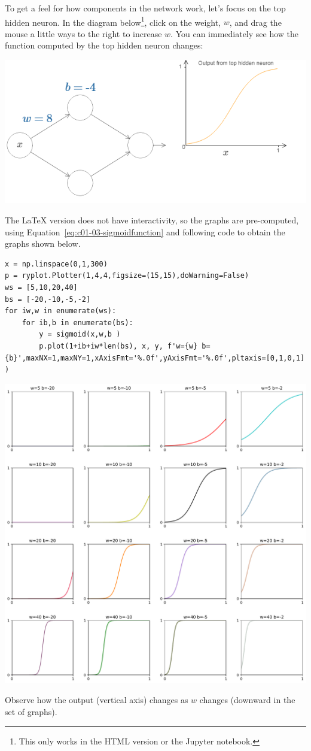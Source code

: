 To get a feel for how components in the network work, let's focus on the top hidden neuron. In the diagram below\footnote{This only works in the HTML version or the Jupyter notebook.}, click on the weight, $w$, and drag the mouse a little ways to the right to increase $w$. You can immediately see how the function computed by the top hidden neuron changes:

{\centering \includegraphics[width=\textwidth,]{pic/wigglyfn07.png} \par}

The \LaTeX{} version does not have interactivity, so the graphs are pre-computed, using Equation~\ref{eq:c01-03-sigmoidfunction} and following code to obtain the graphs shown below.

\begin{lstlisting}
x = np.linspace(0,1,300)
p = ryplot.Plotter(1,4,4,figsize=(15,15),doWarning=False)
ws = [5,10,20,40]
bs = [-20,-10,-5,-2]
for iw,w in enumerate(ws):
    for ib,b in enumerate(bs):
        y = sigmoid(x,w,b )
        p.plot(1+ib+iw*len(bs), x, y, f'w={w} b={b}',maxNX=1,maxNY=1,xAxisFmt='%.0f',yAxisFmt='%.0f',pltaxis=[0,1,0,1] )
\end{lstlisting}

{\centering \includegraphics[width=\textwidth,]{eps/sigmoid4x4plot} \par}
Observe how the output (vertical axis) changes as $w$ changes (downward in the set of graphs).


